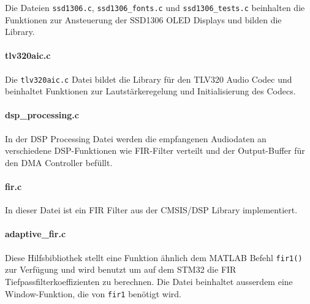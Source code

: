 Die Dateien \texttt{ssd1306.c}, \texttt{ssd1306\_fonts.c} und \texttt{ssd1306\_tests.c} beinhalten die Funktionen zur Ansteuerung der SSD1306 OLED Displays und bilden die Library.


\paragraph{tlv320aic.c}

Die \texttt{tlv320aic.c} Datei bildet die Library für den TLV320 Audio Codec und beinhaltet Funktionen zur Lautstärkeregelung und Initialisierung des Codecs.


\paragraph{dsp\_processing.c}

In der DSP Processing Datei werden die empfangenen Audiodaten an verschiedene DSP-Funktionen wie FIR-Filter verteilt und der Output-Buffer für den DMA Controller befüllt.


\paragraph{fir.c}

In dieser Datei ist ein FIR Filter aus der CMSIS/DSP Library implementiert.


\paragraph{adaptive\_fir.c}

Diese Hilfsbibliothek stellt eine Funktion ähnlich dem MATLAB Befehl \texttt{fir1()} zur Verfügung und wird benutzt um auf dem STM32 die FIR Tiefpassfilterkoeffizienten zu berechnen.
Die Datei beinhaltet ausserdem eine Window-Funktion, die von \texttt{fir1} benötigt wird.

